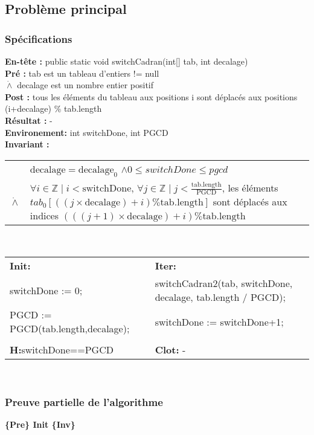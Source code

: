 \subsection{Problème principal}
\subsubsection*{Spécifications}
\noindent \textbf{En-tête :} public static void switchCadran(int[] tab, int decalage)\\
\noindent \textbf{Pré :} tab est un tableau d'entiers != null\\
\indent $\dot{\wedge}$ decalage est un nombre entier positif\\
\textbf{Post :} tous les éléments du tableau aux positions i sont déplacés aux positions (i+decalage) \% tab.length\\
\textbf{Résultat :} - \\

\noindent \textbf{Environement: } int switchDone, int PGCD\\

\noindent \textbf{Invariant :}

\begin{tabular}{lp{14cm}}

& $\mathrm{decalage}=\mathrm{decalage}_{0}$ $\wedge 0 \leq switchDone \leq pgcd$\\
$\dot{\wedge}$ & $\forall i \in \mathbb{Z} \mid i < \mathrm{switchDone} $, $\forall j \in \mathbb{Z} \mid j < \frac{\mathrm{tab.length}}{\mathrm{PGCD}}$, les éléments $tab_{0}[((j \times \mathrm{decalage}) + i) \% \mathrm{tab.length}]$ sont déplacés aux indices $(((j+1)\times \mathrm{decalage})+i) \% \mathrm{tab.length}$ \\
\end{tabular}\\

\noindent \begin{tabular}{ll}
\textbf{Init: } & \textbf{Iter: }\\
switchDone := 0; & switchCadran2(tab, switchDone, decalage, tab.length / PGCD); \\
PGCD := PGCD(tab.length,decalage); & switchDone := switchDone+1;\\
 & \\
\textbf{H:}switchDone==PGCD & \textbf{Clot: } -\\
\end{tabular}\\

\subsubsection*{Preuve partielle de l'algorithme}
\textbf{\{Pre\} Init \{Inv\}}

